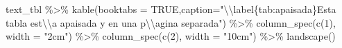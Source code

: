 \documentclass[12pt,a4paper,oneside,]{article}
\newenvironment{Shaded}{\begin{snugshade}}{\end{snugshade}}
\newcommand{\AttributeTok}[1]{\textcolor[rgb]{0.77,0.63,0.00}{#1}}
\newcommand{\ConstantTok}[1]{\textcolor[rgb]{0.00,0.00,0.00}{#1}}
\newcommand{\DecValTok}[1]{\textcolor[rgb]{0.00,0.00,0.81}{#1}}
\newcommand{\FunctionTok}[1]{\textcolor[rgb]{0.00,0.00,0.00}{#1}}
\newcommand{\NormalTok}[1]{#1}
\newcommand{\SpecialCharTok}[1]{\textcolor[rgb]{0.00,0.00,0.00}{#1}}
\newcommand{\StringTok}[1]{\textcolor[rgb]{0.31,0.60,0.02}{#1}}
\numberwithin{dummy}{section}
\theoremstyle{ocrenumbox}
\theoremstyle{blacknumex}
\theoremstyle{blacknumbox}
\theoremstyle{ocrenum}
\theoremstyle{ocrenum}
\begin{document}
\begin{Shaded}
\begin{Highlighting}[]
\NormalTok{text\_tbl }\SpecialCharTok{\%\textgreater{}\%}
  \FunctionTok{kable}\NormalTok{(}\AttributeTok{booktabs =} \ConstantTok{TRUE}\NormalTok{,}\AttributeTok{caption=}\StringTok{"}\SpecialCharTok{\textbackslash{}\textbackslash{}}\StringTok{label\{tab:apaisada\}Esta tabla }
\StringTok{          est}\SpecialCharTok{\textbackslash{}\textbackslash{}}\StringTok{\textquotesingle{}a apaisada y en una p}\SpecialCharTok{\textbackslash{}\textbackslash{}}\StringTok{\textquotesingle{}agina separada"}\NormalTok{) }\SpecialCharTok{\%\textgreater{}\%} 
      \FunctionTok{column\_spec}\NormalTok{(}\FunctionTok{c}\NormalTok{(}\DecValTok{1}\NormalTok{), }
          \AttributeTok{width =} \StringTok{"2cm"}\NormalTok{) }\SpecialCharTok{\%\textgreater{}\%} 
      \FunctionTok{column\_spec}\NormalTok{(}\FunctionTok{c}\NormalTok{(}\DecValTok{2}\NormalTok{), }
          \AttributeTok{width =} \StringTok{"10cm"}\NormalTok{) }\SpecialCharTok{\%\textgreater{}\%} 
      \FunctionTok{landscape}\NormalTok{()}
\end{Highlighting}
\end{Shaded}
\end{document}
